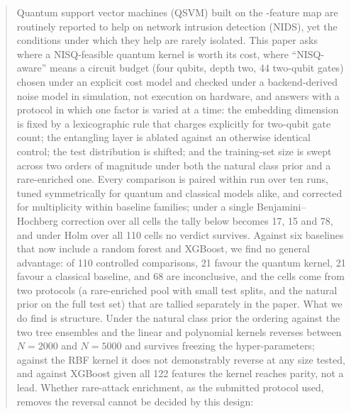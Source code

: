 \begin{abstract}
\begin{revbody}
Quantum support vector machines (QSVM) built on the \ZZ{}-feature map are
routinely reported to help on network intrusion detection (NIDS), yet the
conditions under which they help are rarely isolated. This paper asks where a
NISQ-feasible quantum kernel is worth its cost, where ``NISQ-aware'' means a
circuit budget (four qubits, depth two, 44 two-qubit gates) chosen under an
explicit cost model and checked under a backend-derived noise model in
simulation, not execution on hardware, and answers with a protocol in
which one factor is varied at a time: the embedding dimension is fixed by a
lexicographic rule that charges explicitly for two-qubit gate count; the
entangling layer is ablated against an otherwise identical control; the test
distribution is shifted; and the training-set size is swept across two orders of
magnitude under both the natural class prior and a rare-enriched one. Every
comparison is paired within run over ten runs, tuned symmetrically for quantum
and classical models alike, and corrected for multiplicity within baseline
families; under a single Benjamini--Hochberg correction over all cells the
tally below becomes 17, 15 and 78, and under Holm over all 110 cells no
verdict survives. Against six baselines that now include a
random forest and XGBoost, we find no general advantage: of 110 controlled
comparisons, 21 favour the quantum kernel, 21 favour a classical baseline, and
68 are inconclusive, and the cells come from two protocols (a rare-enriched
pool with small test splits, and the natural prior on the full test set) that
are tallied separately in the paper. What we do find is structure. Under the
natural class prior the ordering against the two tree ensembles and the linear
and polynomial kernels reverses between $N=2000$ and $N=5000$ and survives
freezing the hyper-parameters; against the RBF kernel it does not demonstrably
reverse at any size tested, and against XGBoost given all 122 features the
kernel reaches parity, not a lead. Whether rare-attack enrichment, as the
submitted protocol used, removes the reversal cannot be decided by this design:

\end{revbody}
\end{abstract}
